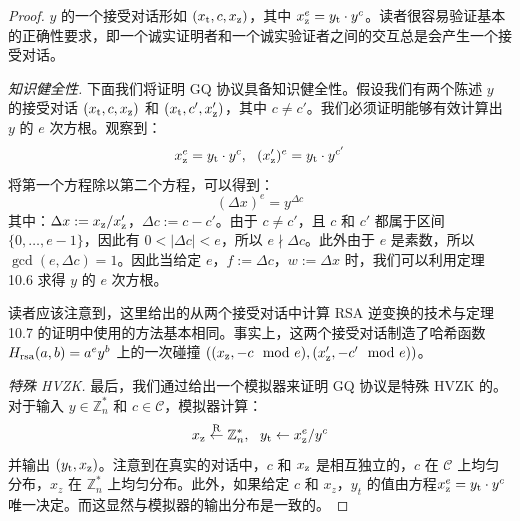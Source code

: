 \begin{proof}
$y$ 的一个接受对话形如 $(x_{\rm t},c,x_{\rm z})$，其中 $x^e_{\rm z}=y_{\rm t}\cdot y^c$。读者很容易验证基本的正确性要求，即一个诚实证明者和一个诚实验证者之间的交互总是会产生一个接受对话。

\vspace{5pt}

\noindent
\emph{知识健全性.}
下面我们将证明 GQ 协议具备知识健全性。假设我们有两个陈述 $y$ 的接受对话 $(x_{\rm t},c,x_{\rm z})$ 和 $(x_{\rm t},c',x_{\rm z}')$，其中 $c\neq c'$。我们必须证明能够有效计算出 $y$ 的 $e$ 次方根。观察到：
$$
x^e_{\rm z}=y_{\rm t}\cdot y^c,~~
(x_{\rm z}')^e=y_{\rm t}\cdot y^{c'}
$$
将第一个方程除以第二个方程，可以得到：
$$
(\Delta x)^e=y^{\Delta c}
$$
其中：$\Delta x:={x_{\rm z}}/{x_{\rm z}'}$，$\Delta c:=c-c'$。由于 $c\neq c'$，且 $c$ 和 $c'$ 都属于区间 $\{0,\dots,e-1\}$，因此有 $0<|\Delta c|<e$，所以 $e\nmid\Delta c$。此外由于 $e$ 是素数，所以 $\gcd(e,\Delta c)=1$。因此当给定 $e$，$f:=\Delta c$，$w:=\Delta x$ 时，我们可以利用定理 10.6 求得 $y$ 的 $e$ 次方根。

读者应该注意到，这里给出的从两个接受对话中计算 RSA 逆变换的技术与定理 10.7 的证明中使用的方法基本相同。事实上，这两个接受对话制造了哈希函数 $H_{\rm rsa}(a,b)=a^ey^b$ 上的一次碰撞 $((x_{\rm z},-c\mod e),(x_{\rm z}',-c'\mod e))$。

\vspace{5pt}

\noindent
\emph{特殊 HVZK.}
最后，我们通过给出一个模拟器来证明 GQ 协议是特殊 HVZK 的。对于输入 $y\in\mathbb{Z}_n^*$ 和 $c\in\mathcal{C}$，模拟器计算：
$$
x_{\rm z}\overset{\rm R}\leftarrow\mathbb{Z}_n^*,~~
y_{\rm t}\leftarrow{x_{\rm z}^e}/{y^c}
$$
并输出 $(y_{\rm t},x_{\rm z})$。注意到在真实的对话中，$c$ 和 $x_{\rm z}$ 是相互独立的，$c$ 在 $\mathcal{C}$ 上均匀分布，$x_z$ 在 $\mathbb{Z}_n^*$ 上均匀分布。此外，如果给定 $c$ 和 $x_z$，$y_t$ 的值由方程$x^e_{\rm z}=y_{\rm t}\cdot y^c$唯一决定。而这显然与模拟器的输出分布是一致的。
\end{proof}